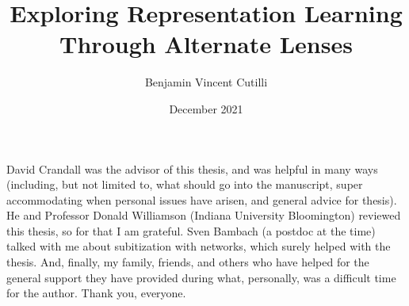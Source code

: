 \documentclass[showabstract,showacknowledgments,showpreface,showdedication]{iuphd}
\title{Exploring Representation Learning Through Alternate Lenses}
\author{Benjamin Vincent Cutilli}
\date{December 2021} %
\begin{document}
\maketitle
\acceptancepage





\begin{acknowledgments}
David Crandall was the advisor of this thesis, and was helpful in many ways (including, but not
limited to, what should go into the manuscript, super accommodating when personal issues have
arisen, and general advice for thesis). He and Professor Donald Williamson (Indiana University
Bloomington) reviewed this thesis, so for that I am grateful. Sven Bambach (a postdoc at the time)
talked with me about subitization with networks, which surely helped with the thesis. And, finally,
my family, friends, and others who have helped for the general support they have provided during
what, personally, was a difficult time for the author. Thank you, everyone.
\end{acknowledgments}





\end{document}
